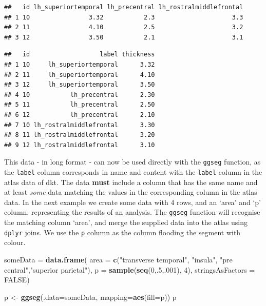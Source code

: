 \documentclass[fleqn,10pt]{wlpeerj} %
\newenvironment{Shaded}{\begin{snugshade}}{\end{snugshade}}
\newcommand{\DataTypeTok}[1]{\textcolor[rgb]{0.13,0.29,0.53}{#1}}
\newcommand{\DecValTok}[1]{\textcolor[rgb]{0.00,0.00,0.81}{#1}}
\newcommand{\KeywordTok}[1]{\textcolor[rgb]{0.13,0.29,0.53}{\textbf{#1}}}
\newcommand{\NormalTok}[1]{#1}
\newcommand{\OperatorTok}[1]{\textcolor[rgb]{0.81,0.36,0.00}{\textbf{#1}}}
\newcommand{\OtherTok}[1]{\textcolor[rgb]{0.56,0.35,0.01}{#1}}
\newcommand{\StringTok}[1]{\textcolor[rgb]{0.31,0.60,0.02}{#1}}
\begin{document}
\begin{verbatim}
##   id lh_superiortemporal lh_precentral lh_rostralmiddlefrontal
## 1 10                3.32           2.3                     3.3
## 2 11                4.10           2.5                     3.2
## 3 12                3.50           2.1                     3.1
\end{verbatim}

\begin{Shaded}
\end{Shaded}

\begin{verbatim}
##   id                   label thickness
## 1 10     lh_superiortemporal      3.32
## 2 11     lh_superiortemporal      4.10
## 3 12     lh_superiortemporal      3.50
## 4 10           lh_precentral      2.30
## 5 11           lh_precentral      2.50
## 6 12           lh_precentral      2.10
## 7 10 lh_rostralmiddlefrontal      3.30
## 8 11 lh_rostralmiddlefrontal      3.20
## 9 12 lh_rostralmiddlefrontal      3.10
\end{verbatim}

This data - in long format - can now be used directly with the \texttt{ggseg} function, as the \texttt{label} column corresponds in name and content with the \texttt{label} column in the atlas data of dkt.
The data \textbf{must} include a column that has the same name and at least \emph{some} data matching the values in the corresponding column in the atlas data.
In the next example we create some data with 4 rows, and an `area' and `p' column, representing the results of an analysis.
The \texttt{ggseg} function will recognise the matching column `area', and merge the supplied data into the atlas using \texttt{dplyr} joins.
We use the \texttt{p} column as the column flooding the segment with colour.

\begin{Shaded}
\begin{Highlighting}[]
\NormalTok{someData =}\StringTok{ }\KeywordTok{data.frame}\NormalTok{(}
  \DataTypeTok{area =} \KeywordTok{c}\NormalTok{(}\StringTok{"transverse temporal"}\NormalTok{, }\StringTok{"insula"}\NormalTok{,}
           \StringTok{"pre central"}\NormalTok{,}\StringTok{"superior parietal"}\NormalTok{),}
  \DataTypeTok{p =} \KeywordTok{sample}\NormalTok{(}\KeywordTok{seq}\NormalTok{(}\DecValTok{0}\NormalTok{,.}\DecValTok{5}\NormalTok{,.}\DecValTok{001}\NormalTok{), }\DecValTok{4}\NormalTok{),}
  \DataTypeTok{stringsAsFactors =} \OtherTok{FALSE}\NormalTok{)}

\NormalTok{p <-}\StringTok{ }\KeywordTok{ggseg}\NormalTok{(}\DataTypeTok{.data=}\NormalTok{someData, }\DataTypeTok{mapping=}\KeywordTok{aes}\NormalTok{(}\DataTypeTok{fill=}\NormalTok{p))}
\NormalTok{p}
\end{Highlighting}
\end{Shaded}
\end{document}
